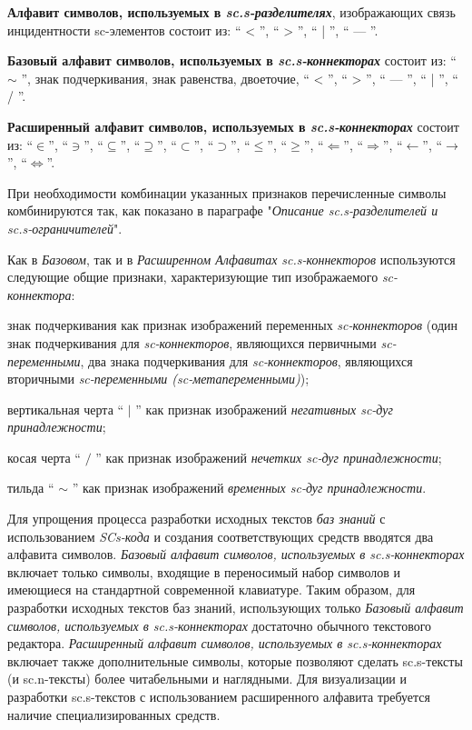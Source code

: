 \textbf{Алфавит символов, используемых в \textit{sc.s-разделителях}}, изображающих связь инцидентности sc-элементов состоит из: `` < ''{}, `` > ''{}, `` | ''{}, `` --- ''{}.

\textbf{Базовый алфавит символов, используемых в \textit{sc.s-коннекторах}} состоит из: `` $\sim$ ''{}, знак подчеркивания, знак равенства, двоеточие, `` < ''{}, `` > ''{}, `` --- ''{}, `` | ''{}, `` / ''{}.
	
\textbf{Расширенный алфавит символов, используемых в \textit{sc.s-коннекторах}\scnsupergroupsign} состоит из:
	``$\in$''{}, 
	``$\ni$''{}, ``$\subseteq$''{}, ``$\supseteq$''{},   ``$\subset$''{}, ``$\supset$''{}, ``$\leq$''{},  ``$\geq$''{}, ``$\Leftarrow$''{}, ``$\Rightarrow$''{}, ``$\leftarrow$''{}, ``$\rightarrow$''{}, 
	``$\Leftrightarrow$''{}.


При необходимости комбинации указанных признаков перечисленные символы комбинируются так, как показано в параграфе "\textit{Описание sc.s-разделителей и sc.s-ограничителей}"{}.

Как в \textit{Базовом}, так и в \textit{Расширенном Алфавитах} \textit{sc.s-коннекторов} используются следующие общие признаки, характеризующие тип изображаемого \textit{sc-коннектора}:
\begin{textitemize}
	\item знак подчеркивания как признак изображений переменных \textit{sc-коннекторов} (один знак подчеркивания для \textit{sc-коннекторов}, являющихся первичными \textit{sc-переменными}, два знака подчеркивания для \textit{sc-коннекторов}, являющихся вторичными \textit{sc-переменными (sc-метапеременными)});
	\item вертикальная черта `` $ | $ ''{} как признак изображений \textit{негативных sc-дуг принадлежности}; 
	\item косая черта `` $ / $ ''{} как признак изображений \textit{нечетких sc-дуг принадлежности};
	\item тильда `` $ \sim $ ''{} как признак изображений \textit{временных sc-дуг принадлежности}.   
\end{textitemize}

Для упрощения процесса разработки исходных текстов \textit{баз знаний} с использованием \textit{SCs-кода} и создания соответствующих средств вводятся два алфавита символов. \textit{Базовый алфавит символов, используемых в sc.s-коннекторах\scnsupergroupsign} включает только символы, входящие в переносимый набор символов и имеющиеся на стандартной современной клавиатуре. Таким образом, для разработки исходных текстов баз знаний, использующих только \textit{Базовый алфавит символов, используемых в sc.s-коннекторах\scnsupergroupsign} достаточно обычного текстового редактора. \textit{Расширенный алфавит символов, используемых в sc.s-коннекторах\scnsupergroupsign} включает также дополнительные символы, которые позволяют сделать sc.s-тексты (и sc.n-тексты) более читабельными и наглядными. Для визуализации и разработки sc.s-текстов с использованием расширенного алфавита требуется наличие специализированных средств.

